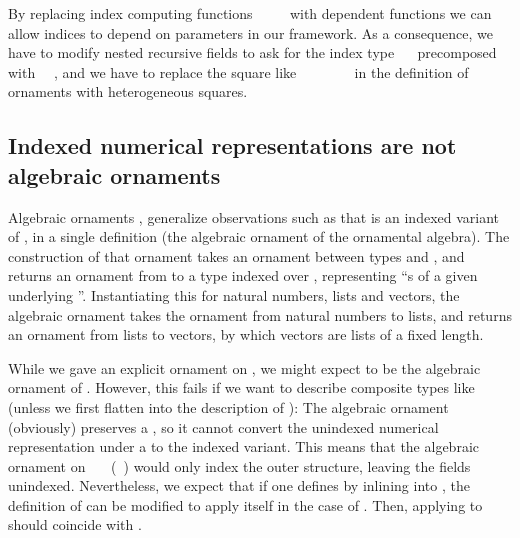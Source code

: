 By replacing index computing functions \ \AF{\&}\ \ \  with dependent functions
we can allow indices to depend on parameters in our framework. As a consequence, we have to modify nested recursive fields to ask for the index type \ \  precomposed with \ \ , and we have to replace the square like \ \ \ \ \ \ \  in the definition of ornaments with heterogeneous squares.


\subsection{Indexed numerical representations are not algebraic ornaments}\label{sec:ix-not-alg}
\begin{outline}
    
Algebraic ornaments \cite{algorn}, generalize observations such as that  is an indexed variant of , in a single definition  (the algebraic ornament of the ornamental algebra). The construction of that ornament takes an ornament between types  and , and returns an ornament from  to a type indexed over , representing ``s of a given underlying ''. Instantiating this for natural numbers, lists and vectors, the algebraic ornament takes the ornament from natural numbers to lists, and returns an ornament from lists to vectors, by which vectors are lists of a fixed length.

While we gave an explicit ornament  on , we might expect  to be the algebraic ornament of . However, this fails if we want to describe composite types like  (unless we first flatten  into the description of ): The algebraic ornament (obviously) preserves a , so it cannot convert the unindexed numerical representation under a  to the indexed variant. This means that the algebraic ornament on \ \AV{=}\ \ (\ ) would only index the outer structure, leaving the  fields unindexed.
Nevertheless, we expect that if one defines  by inlining  into , the definition of  can be modified to apply itself in the case of . Then, applying  to  should coincide with .

\end{outline}

